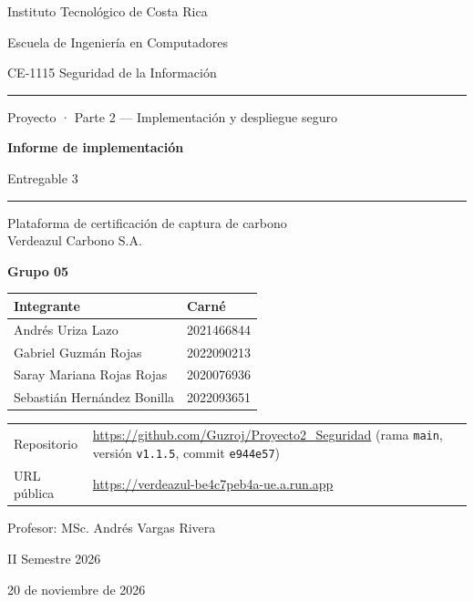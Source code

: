 \documentclass[10pt,letterpaper]{article}
\newcommand{\cod}[1]{\texttt{#1}}
\begin{document}
\begin{titlepage}
\centering
{\large Instituto Tecnológico de Costa Rica\par}
{\large Escuela de Ingeniería en Computadores\par}
\vspace{0.3cm}
{\large CE-1115 Seguridad de la Información\par}
\vspace{2.0cm}
{\rule{\linewidth}{1pt}\par}
\vspace{0.4cm}
{\normalsize Proyecto · Parte 2 — Implementación y despliegue seguro\par}
\vspace{0.3cm}
{\Huge\bfseries Informe de implementación\par}
\vspace{0.3cm}
{\large Entregable 3\par}
\vspace{0.3cm}
{\rule{\linewidth}{1pt}\par}
\vspace{0.6cm}
{\large Plataforma de certificación de captura de carbono\\ Verdeazul Carbono S.A.\par}
\vspace{1.8cm}
{\large\bfseries Grupo 05\par}
\vspace{0.4cm}
\begin{tabular}{ll}
\toprule
\textbf{Integrante} & \textbf{Carné}\\
\midrule
Andrés Uriza Lazo & 2021466844\\
Gabriel Guzmán Rojas & 2022090213\\
Saray Mariana Rojas Rojas & 2020076936\\
Sebastián Hernández Bonilla & 2022093651\\
\bottomrule
\end{tabular}
\vspace{1.4cm}

{\small
\begin{tabular}{@{}ll@{}}
Repositorio & \url{https://github.com/Guzroj/Proyecto2_Seguridad} (rama \cod{main}, versión \cod{v1.1.5}, commit \cod{e944e57})\\
URL pública & \url{https://verdeazul-be4c7peb4a-ue.a.run.app}\\
\end{tabular}\par}
\vfill
{Profesor: MSc. Andrés Vargas Rivera\par}
{II Semestre 2026\par}
{20 de noviembre de 2026\par}
\end{titlepage}
\end{document}
